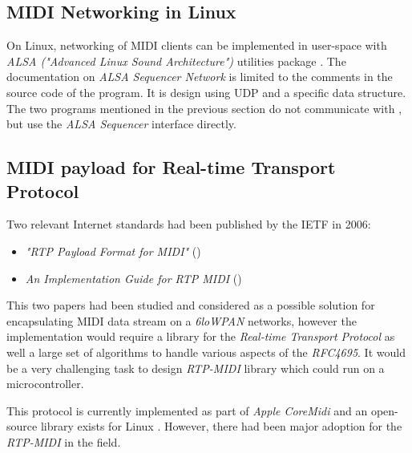 \subsection{MIDI Networking in Linux}

  On Linux, networking of MIDI clients can be implemented in user-space
 with \emph{ALSA ("Advanced Linux Sound Architecture")} utilities package
 \cite{links:linux:alsa}.
 The documentation on \emph{ALSA Sequencer Network} is limited to the
 comments in the source code of the  program. It is design
 using UDP and a specific data structure. The two programs mentioned in
 the previous section do not communicate with , but use
 the \emph{ALSA Sequencer} interface directly.


\subsection{MIDI payload for Real-time Transport Protocol}

 Two relevant Internet standards had been published by the IETF in 2006:
 \begin{itemize}
  \item\emph{"RTP Payload Format for MIDI"} ()
  \item\emph{An Implementation Guide for RTP MIDI} ()
 \end{itemize}

 This two papers had been studied and considered as a possible solution
 for encapsulating MIDI data stream on a \emph{6loWPAN} networks, however
 the implementation would require a library for the \emph{Real-time
 Transport Protocol} as well a large set of algorithms to handle various
 aspects of the \emph{RFC4695}. It would be a very challenging task to
 design \emph{RTP-MIDI} library which could run on a microcontroller.

 This protocol is currently implemented as part of \emph{Apple CoreMidi}
 \cite{links:wiki:rtpmidi} and an open-source library exists for Linux
 \cite{links:rtpmidi}. However, there had been major adoption for the
 \emph{RTP-MIDI} in the field.

